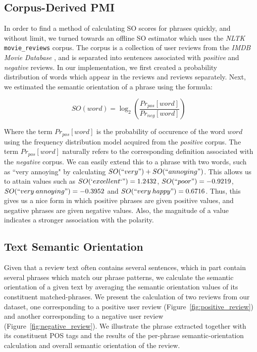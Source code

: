 \documentclass[11pt]{report} %
\begin{document}
\subsection{Corpus-Derived PMI}
In order to find a method of calculating SO scores for phrases quickly, and without limit, we turned towards an offline SO estimator which uses the \textit{NLTK} \verb|movie_reviews| corpus. The corpus is a collection of user reviews from the \textit{IMDB Movie Database} , and is separated into sentences associated with \textit{positive} and \textit{negative} reviews. In our implementation, we first created a probability distribution of words which appear in the  reviews and  reviews separately. Next, we estimated the semantic orientation of a phrase using the formula:

\begin{equation*} SO(word) = \log_2 \left(\frac{Pr_{pos}[word]}{Pr_{neg}[word]}\right) \end{equation*}

Where the term $Pr_{pos}[word]$ is the probability of occurence of the word $word$ using the frequency distribution model acquired from the \textit{positive} corpus. The term $Pr_{pos}[word]$ naturally refers to the corresponding definition associated with the \textit{negative} corpus. We can easily extend this to a phrase with two words, such as ``very annoying" by calculating $SO(``very") + SO(``annoying")$. This allows us to attain values such as $SO(`excellent`")=1.2432$, $SO(``poor")=-0.9219$, $SO(``very \: annoying")=-0.3952$ and $SO(``very \: happy")=0.6716$. Thus, this gives us a nice form in which positive phrases are given positive values, and negative phrases are given negative values. Also, the magnitude of a value indicates a stronger association with the polarity.

\subsection{Text Semantic Orientation}
Given that a review text often contains several sentences, which in part contain several phrases which match our phrase patterns, we calculate the semantic orientation of a given text by averaging the semantic orientation values of its constituent matched-phrases. We present the calculation of two reviews from our dataset, one corresponding to a positive user review (Figure~\ref{fig:positive_review}) and another corresponding to a negative user review (Figure~\ref{fig:negative_review}). We illustrate the phrase extracted together with its constituent POS tags and the results of the per-phrase semantic-orientation calculation and overall semantic orientation of the review.
\end{document}
